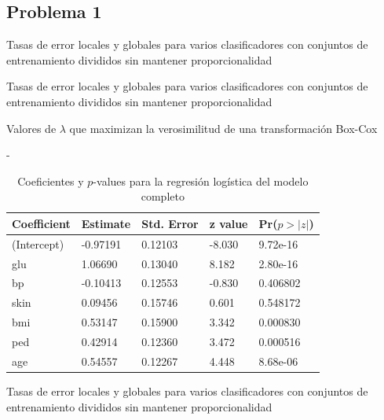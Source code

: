 \documentclass[11pt]{article}
\begin{document}
\subsection*{Problema 1}

\begin{table}[H]
    \caption{Tasas de error locales y globales para varios clasificadores con conjuntos de entrenamiento divididos sin mantener proporcionalidad}
    \label{1-gen-ab}
\end{table}

\begin{table}[H]
    \caption{Tasas de error locales y globales para varios clasificadores con conjuntos de entrenamiento divididos sin mantener proporcionalidad}
    \label{1-gen-eq-tab}
\end{table}
\begin{table}[H]
    \centering
    
    \caption{Valores de $\lambda$ que maximizan la verosimilitud de una transformación Box-Cox}
    \label{1-bxparam-tab}
\end{table}
\begin{table}[H]
    \centering-
    \begin{tabular}{p{2cm}p{2cm}p{2cm}p{2cm}p{2cm}}
        Coefficient & Estimate & Std. Error  & z value & Pr($p>|z|$) \\    
        \hline
        (Intercept)& -0.97191 & 0.12103  & -8.030 & 9.72e-16  \\
        glu &  1.06690 & 0.13040  &  8.182 & 2.80e-16  \\
        bp &   -0.10413 & 0.12553  & -0.830 & 0.406802    \\
        skin &  0.09456 & 0.15746  &  0.601 & 0.548172    \\
        bmi &  0.53147 & 0.15900  &  3.342 & 0.000830  \\
        ped &  0.42914 & 0.12360  &  3.472 & 0.000516  \\
        age &  0.54557 & 0.12267  &  4.448 & 8.68e-06  \\
    \end{tabular}
    \caption{Coeficientes y $p$-values para la regresión logística del modelo completo}
    \label{1-log-p}
\end{table}

\begin{table}[H]
    \caption{Tasas de error locales y globales para varios clasificadores con conjuntos de entrenamiento divididos sin mantener proporcionalidad}
    \label{1-final-tab}
\end{table}
\end{document}

